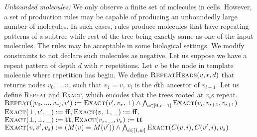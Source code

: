 {\em Unbounded molecules: }
We only observe a finite set of molecules in cells.
However, a set of production rules may be capable of producing an unboundedly large number of molecules.
In such cases, rules produce molecules that have repeating patterns of a subtree while rest of the tree being exactly same as one of the input molecules. The rules may be acceptable in some biological settings. We modify constraints to not declare such molecules as negative.
Let us suppose we have a repeat pattern of depth $d$ with $r$ repetitions.
Let $v$ be the node in template molecule where repetition has begin.
We define $\textsc{RepeatHeads}(v,r,d)$ that returns nodes $v_0,.... v_r$ such that
$v_1 = v$, $v_i$ is the $d$th ancestor of $v_{i+1}$.
Let us define \textsc{Repeat} and \textsc{Exact}, which encodes that the trees rooted at $v_{i}$s repeat.\\
$\textsc{Repeat}([v_0,...,v_r], v') :=  \textsc{Exact}(v',v_r,\bot) \land \bigwedge_{i\in[0,r-1]} \textsc{Exact}( v_i, v_{i+1},v_{i+1})$\\
$\textsc{Exact}(\bot,v',\_) := \mathbf{ff}, \textsc{Exact}(v,\bot,\_) := \mathbf{ff},$\\
$ \textsc{Exact}(\bot,\bot,\_) := \mathbf{tt},\textsc{Exact}(v_s,\_,v_s) := \mathbf{tt}$\\
$\textsc{Exact}(v,v',v_s) := (M(v) = M(v')) \land \bigwedge_{i \in [1,w]} \textsc{Exact}(C(v,i),C(v',i),v_s)$\\
